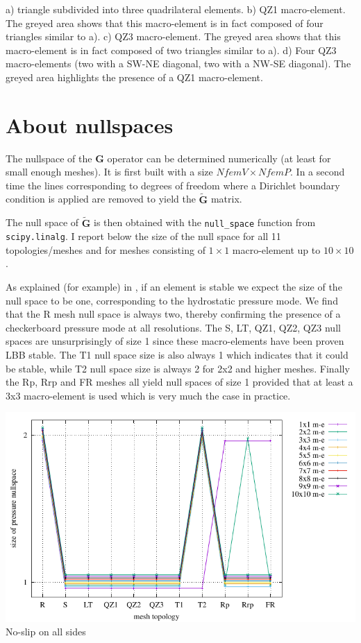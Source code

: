 \documentclass[a4paper,12pt]{article}
\begin{document}


a) triangle subdivided into three quadrilateral elements.
b) QZ1 macro-element. The greyed area shows that this macro-element is 
in fact composed of four triangles similar to a).
c) QZ3 macro-element. The greyed area shows that this macro-element is
in fact composed of two triangles similar to a).
d) Four QZ3 macro-elements (two with a SW-NE diagonal, two with a NW-SE diagonal).
The greyed area highlights the presence of a QZ1 macro-element. 


\newpage
\section{About nullspaces}



The nullspace of the ${ \bm G}$ operator can be determined 
numerically (at least for small enough meshes). 
It is first built with a size $NfemV \times NfemP$.
In a second time the lines corresponding to degrees of freedom 
where a Dirichlet boundary condition is applied are removed to yield
the $\tilde{\bm G}$ matrix. 

The null space of $\tilde{\bm G}$ is then obtained with the 
{\tt null\_space} function from {\tt scipy.linalg}.
I report below the size of the null space for all 11 topologies/meshes
and for meshes consisting of $1\times 1$ macro-element up to $10\times 10$.

As explained (for example) in \cite{sagl81a}, if an element is stable we 
expect the size of the null space to be one, corresponding to the 
hydrostatic pressure mode.
We find that the R mesh null space is always two, thereby confirming 
the presence of a checkerboard pressure mode at all resolutions. 
The S, LT, QZ1, QZ2, QZ3 null spaces are unsurprisingly of size 1 since 
these macro-elements have been proven LBB stable. 
The T1 null space size is also always 1 which indicates that it could be stable,
while T2 null space size is always 2 for 2x2 and higher meshes.
Finally the Rp, Rrp and FR meshes all yield null spaces of size 1 
provided that at least a 3x3 macro-element is used which is very much the 
case in practice. 

\begin{center}
\includegraphics[width=14cm]{../results/nullspace/nullspace_NS.pdf}\\
No-slip on all sides
\end{center}
\end{document}
